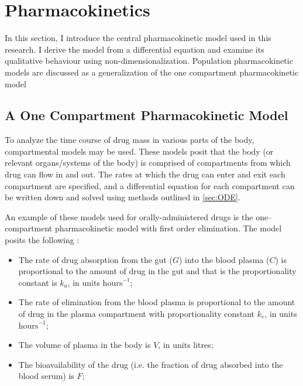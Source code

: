 \section{Pharmacokinetics} \label{PKPD}


In this section, I  introduce the central pharmacokinetic model used in this research.   I derive the model from a differential equation and examine its qualitative behaviour using non-dimensionalization.  Population pharmacokinetic models are discussed as a generalization of the one compartment pharmacokinetic model


\subsection{A One Compartment Pharmacokinetic Model} 

To analyze the time course of drug mass in various parts of the body, compartmental models may be used.  These models posit that the body (or relevant organs/systems of the body) is comprised of compartments from which drug can flow in and out. The rates at which the drug can enter and exit each compartment are specified, and a differential equation for each compartment can be written down and solved using methods outlined in \cref{sec:ODE}.

An example of these models used for orally-administered drugs is the one--compartment pharmacokinetic model with first order elimination.  The model posits the following \cite{wakefield1992bayesian}:  
%
\begin{itemize}
\item The rate of drug absorption from the gut ($ G  $) into the blood plasma ($ C $) is proportional to the amount of drug in the gut and that is the proportionality constant is $ k_a $, in units $ \text{hours}^{-1} $;

\item The rate of elimination from the blood plasma is proportional to the amount of drug in the plasma compartment with proportionality constant $ k_e $, in units $ \text{hours}^{-1} $;

\item The volume of plasma in the body is $ V $, in units litres;

\item The bioavailability of the drug (i.e. the fraction of drug absorbed into the blood serum) is $F$;
\end{itemize}

